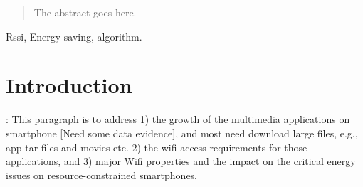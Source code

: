 \documentclass[journal]{IEEEtran}
\begin{document}







\maketitle

\begin{abstract}
The abstract goes here.
\end{abstract}

\begin{IEEEkeywords}
Rssi, Energy saving, algorithm.
\end{IEEEkeywords}



%
\IEEEpeerreviewmaketitle



\section{Introduction}
% 
% 
% 
% 
: This paragraph is to address 1) the growth of the multimedia applications on smartphone [Need some data evidence], and most need download large files, e.g., app tar files and movies etc. 2) the wifi access requirements for those applications, and 3) major Wifi properties and the impact on the critical energy issues on resource-constrained smartphones. 
\end{document}

